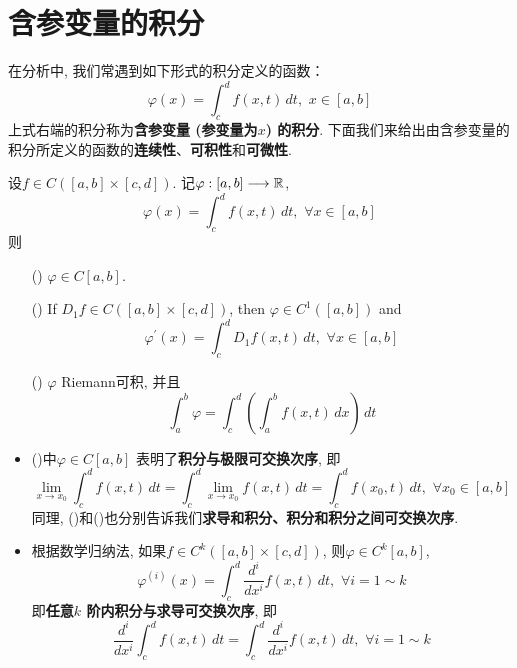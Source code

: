 \newpage

\section{含参变量的积分}
	在分析中, 我们常遇到如下形式的积分定义的函数：
	\[ \varphi(x) = \int_{c}^d f(x , t) \, dt , \,\, x \in [a , b] \]
	上式右端的积分称为\textbf{含参变量 (参变量为$x$) 的积分}. 下面我们来给出由含参变量的积分所定义的函数的\textbf{连续性}、\textbf{可积性}和\textbf{可微性}. 
	
	\begin{thm}\label{thm A.2.1}
		设$f \in C([a , b] \times [c , d])$. 记$\varphi : [a , b] \longrightarrow \mathbb{R}$, 
		\[ \varphi(x) = \int_{c}^d f(x , t) \, dt , \,\, \forall x \in [a , b] \]
		则
		\begin{enumerate}
			\item[(\rmnum{1})] $\varphi \in C[a , b]$. 
			
			\item[(\rmnum{2})] If $D_{1}f \in C([a , b] \times [c , d])$, then $\varphi \in C^{1}([a , b])$ and 
			\[ \varphi^{'}(x) = \int_{c}^d D_{1}f(x , t) \,  dt , \,\, \forall x \in [a , b] \]
			
			\item[(\rmnum{3})] $\varphi$ Riemann可积, 并且
			\[ \int_{a}^b \varphi = \int_{c}^d \left( \int_{a}^b f(x , t) \, dx \right) \, dt \]
		\end{enumerate}
	
		\vspace{4em}
		
		\begin{rmk}
			\begin{itemize}
				\item ()中$\varphi \in C[a , b]$ 表明了\textbf{积分与极限可交换次序}, 即
				\[ \lim_{x \to x_0} \int_{c}^d f(x , t) \, dt = \int_{c}^d \lim_{x \to x_0} f(x , t) \, dt = \int_{c}^d f(x_0 , t) \, dt , \,\, \forall x_0 \in [a , b] \]
				同理, ()和()也分别告诉我们\textbf{求导和积分、积分和积分之间可交换次序}.
				
				\vspace{4em}
				
				\item 根据数学归纳法, 如果$f \in C^{k}([a , b] \times [c , d])$, 则$\varphi \in C^{k}[a , b]$, 
				\[ \varphi^{(i)}(x) = \int_{c}^d \frac{d^i}{d x^i} f(x , t) \, dt , \,\, \forall i = 1 \sim k \]
				即\textbf{任意$k$ 阶内积分与求导可交换次序}, 即
				\[ \frac{d^i}{dx^{i}} \int_{c}^d f(x , t) \, dt = \int_{c}^d \frac{d^i}{d x^i} f(x , t) \, dt , \,\, \forall i = 1 \sim k \]
			\end{itemize}
		\end{rmk}
	\end{thm}

